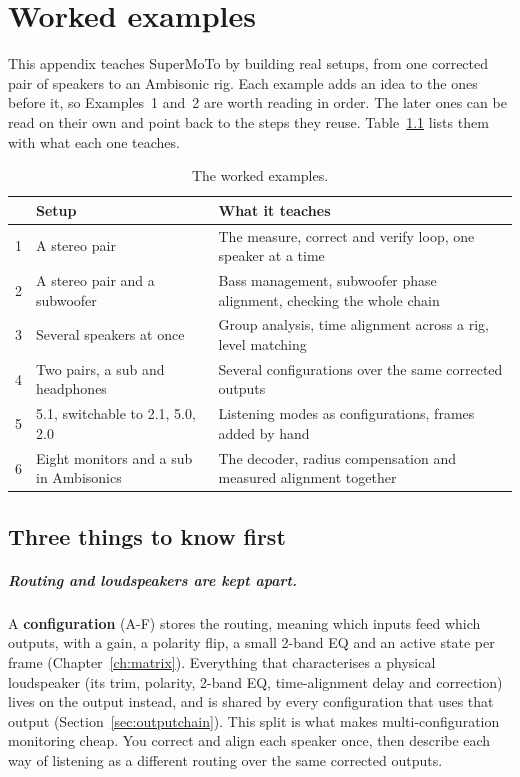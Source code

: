 \chapter{Worked examples}\label{ch:examples}

This appendix teaches SuperMoTo by building real setups, from one corrected pair of speakers to an Ambisonic rig. Each example adds an idea to the ones before it, so Examples~1 and~2 are worth reading in order. The later ones can be read on their own and point back to the steps they reuse. Table~\ref{tab:examples} lists them with what each one teaches.

\begin{table}[h]\centering
\begin{tabularx}{\textwidth}{l l X}
\toprule
& Setup & What it teaches \\
\midrule
1 & A stereo pair & The measure, correct and verify loop, one speaker at a time \\
2 & A stereo pair and a subwoofer & Bass management, subwoofer phase alignment, checking the whole chain \\
3 & Several speakers at once & Group analysis, time alignment across a rig, level matching \\
4 & Two pairs, a sub and headphones & Several configurations over the same corrected outputs \\
5 & 5.1, switchable to 2.1, 5.0, 2.0 & Listening modes as configurations, frames added by hand \\
6 & Eight monitors and a sub in Ambisonics & The decoder, radius compensation and measured alignment together \\
\bottomrule
\end{tabularx}
\caption{The worked examples.}\label{tab:examples}
\end{table}

\section{Three things to know first}\label{sec:ex-ideas}

\paragraph{Routing and loudspeakers are kept apart.} A \textbf{configuration} (A-F) stores the routing, meaning which inputs feed which outputs, with a gain, a polarity flip, a small 2-band EQ and an active state per frame (Chapter~\ref{ch:matrix}). Everything that characterises a physical loudspeaker (its trim, polarity, 2-band EQ, time-alignment delay and  correction) lives on the output instead, and is shared by every configuration that uses that output (Section~\ref{sec:outputchain}). This split is what makes multi-configuration monitoring cheap. You correct and align each speaker once, then describe each way of listening as a different routing over the same corrected outputs.

